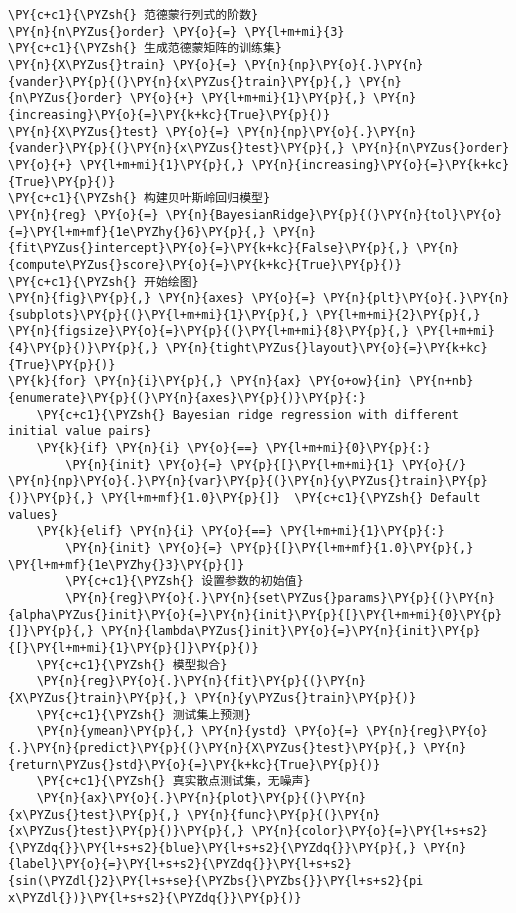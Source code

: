 \begin{Verbatim}[commandchars=\\\{\}]
\PY{c+c1}{\PYZsh{} 范德蒙行列式的阶数}
\PY{n}{n\PYZus{}order} \PY{o}{=} \PY{l+m+mi}{3}
\PY{c+c1}{\PYZsh{} 生成范德蒙矩阵的训练集}
\PY{n}{X\PYZus{}train} \PY{o}{=} \PY{n}{np}\PY{o}{.}\PY{n}{vander}\PY{p}{(}\PY{n}{x\PYZus{}train}\PY{p}{,} \PY{n}{n\PYZus{}order} \PY{o}{+} \PY{l+m+mi}{1}\PY{p}{,} \PY{n}{increasing}\PY{o}{=}\PY{k+kc}{True}\PY{p}{)}
\PY{n}{X\PYZus{}test} \PY{o}{=} \PY{n}{np}\PY{o}{.}\PY{n}{vander}\PY{p}{(}\PY{n}{x\PYZus{}test}\PY{p}{,} \PY{n}{n\PYZus{}order} \PY{o}{+} \PY{l+m+mi}{1}\PY{p}{,} \PY{n}{increasing}\PY{o}{=}\PY{k+kc}{True}\PY{p}{)}
\PY{c+c1}{\PYZsh{} 构建贝叶斯岭回归模型}
\PY{n}{reg} \PY{o}{=} \PY{n}{BayesianRidge}\PY{p}{(}\PY{n}{tol}\PY{o}{=}\PY{l+m+mf}{1e\PYZhy{}6}\PY{p}{,} \PY{n}{fit\PYZus{}intercept}\PY{o}{=}\PY{k+kc}{False}\PY{p}{,} \PY{n}{compute\PYZus{}score}\PY{o}{=}\PY{k+kc}{True}\PY{p}{)}
\PY{c+c1}{\PYZsh{} 开始绘图}
\PY{n}{fig}\PY{p}{,} \PY{n}{axes} \PY{o}{=} \PY{n}{plt}\PY{o}{.}\PY{n}{subplots}\PY{p}{(}\PY{l+m+mi}{1}\PY{p}{,} \PY{l+m+mi}{2}\PY{p}{,} \PY{n}{figsize}\PY{o}{=}\PY{p}{(}\PY{l+m+mi}{8}\PY{p}{,} \PY{l+m+mi}{4}\PY{p}{)}\PY{p}{,} \PY{n}{tight\PYZus{}layout}\PY{o}{=}\PY{k+kc}{True}\PY{p}{)}
\PY{k}{for} \PY{n}{i}\PY{p}{,} \PY{n}{ax} \PY{o+ow}{in} \PY{n+nb}{enumerate}\PY{p}{(}\PY{n}{axes}\PY{p}{)}\PY{p}{:}
    \PY{c+c1}{\PYZsh{} Bayesian ridge regression with different initial value pairs}
    \PY{k}{if} \PY{n}{i} \PY{o}{==} \PY{l+m+mi}{0}\PY{p}{:}
        \PY{n}{init} \PY{o}{=} \PY{p}{[}\PY{l+m+mi}{1} \PY{o}{/} \PY{n}{np}\PY{o}{.}\PY{n}{var}\PY{p}{(}\PY{n}{y\PYZus{}train}\PY{p}{)}\PY{p}{,} \PY{l+m+mf}{1.0}\PY{p}{]}  \PY{c+c1}{\PYZsh{} Default values}
    \PY{k}{elif} \PY{n}{i} \PY{o}{==} \PY{l+m+mi}{1}\PY{p}{:}
        \PY{n}{init} \PY{o}{=} \PY{p}{[}\PY{l+m+mf}{1.0}\PY{p}{,} \PY{l+m+mf}{1e\PYZhy{}3}\PY{p}{]}
        \PY{c+c1}{\PYZsh{} 设置参数的初始值}
        \PY{n}{reg}\PY{o}{.}\PY{n}{set\PYZus{}params}\PY{p}{(}\PY{n}{alpha\PYZus{}init}\PY{o}{=}\PY{n}{init}\PY{p}{[}\PY{l+m+mi}{0}\PY{p}{]}\PY{p}{,} \PY{n}{lambda\PYZus{}init}\PY{o}{=}\PY{n}{init}\PY{p}{[}\PY{l+m+mi}{1}\PY{p}{]}\PY{p}{)}
    \PY{c+c1}{\PYZsh{} 模型拟合}
    \PY{n}{reg}\PY{o}{.}\PY{n}{fit}\PY{p}{(}\PY{n}{X\PYZus{}train}\PY{p}{,} \PY{n}{y\PYZus{}train}\PY{p}{)}
    \PY{c+c1}{\PYZsh{} 测试集上预测}
    \PY{n}{ymean}\PY{p}{,} \PY{n}{ystd} \PY{o}{=} \PY{n}{reg}\PY{o}{.}\PY{n}{predict}\PY{p}{(}\PY{n}{X\PYZus{}test}\PY{p}{,} \PY{n}{return\PYZus{}std}\PY{o}{=}\PY{k+kc}{True}\PY{p}{)}
    \PY{c+c1}{\PYZsh{} 真实散点测试集，无噪声}
    \PY{n}{ax}\PY{o}{.}\PY{n}{plot}\PY{p}{(}\PY{n}{x\PYZus{}test}\PY{p}{,} \PY{n}{func}\PY{p}{(}\PY{n}{x\PYZus{}test}\PY{p}{)}\PY{p}{,} \PY{n}{color}\PY{o}{=}\PY{l+s+s2}{\PYZdq{}}\PY{l+s+s2}{blue}\PY{l+s+s2}{\PYZdq{}}\PY{p}{,} \PY{n}{label}\PY{o}{=}\PY{l+s+s2}{\PYZdq{}}\PY{l+s+s2}{sin(\PYZdl{}2}\PY{l+s+se}{\PYZbs{}\PYZbs{}}\PY{l+s+s2}{pi x\PYZdl{})}\PY{l+s+s2}{\PYZdq{}}\PY{p}{)}

\end{Verbatim}
